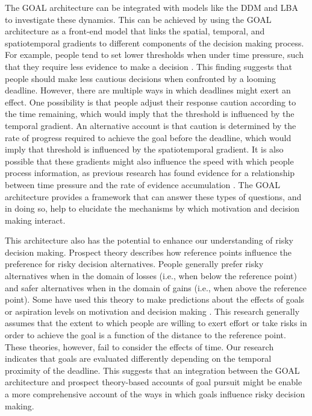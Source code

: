 \documentclass[a4paper,doc,natbib,donotrepeattitle]{apa6}
\begin{document}
The GOAL architecture can be integrated with models like the DDM and LBA to investigate these dynamics. This can be achieved by using the GOAL architecture as a front-end model that links the spatial, temporal, and spatiotemporal gradients to different components of the decision making process. For example, people tend to set lower thresholds when under time pressure, such that they require less evidence to make a decision \citep{Ratcliff1998,Pleskac2018,Usher2001,Rae2014}. This finding suggests that people should make less cautious decisions when confronted by a looming deadline. However, there are multiple ways in which deadlines might exert an effect. One possibility is that people adjust their response caution according to the time remaining, which would imply that the threshold is influenced by the temporal gradient. An alternative account is that caution is determined by the rate of progress required to achieve the goal before the deadline, which would imply that threshold is influenced by the spatiotemporal gradient. It is also possible that these gradients might also influence the speed with which people process information, as previous research has found evidence for a relationship between time pressure and the rate of evidence accumulation \citep{Rae2014,Palada2018}. The GOAL architecture provides a framework that can answer these types of questions, and in doing so, help to elucidate the mechanisms by which motivation and decision making interact.

This architecture also has the potential to enhance our understanding of risky decision making. Prospect theory describes how reference points influence the preference for risky decision alternatives. People generally prefer risky alternatives when in the domain of losses (i.e., when below the reference point) and safer alternatives when in the domain of gains (i.e., when above the reference point). Some have used this theory to make predictions about the effects of goals or aspiration levels on motivation and decision making \citep[e.g.,][]{Heath1999,Wang2012a}. This research generally assumes that the extent to which people are willing to exert effort or take risks in order to achieve the goal is a function of the distance to the reference point. These theories, however, fail to consider the effects of time. Our research indicates that goals are evaluated differently depending on the temporal proximity of the deadline. This suggests that an integration between the GOAL architecture and prospect theory-based accounts of goal pursuit might be enable a more comprehensive account of the ways in which goals influence risky decision making.
\end{document}
